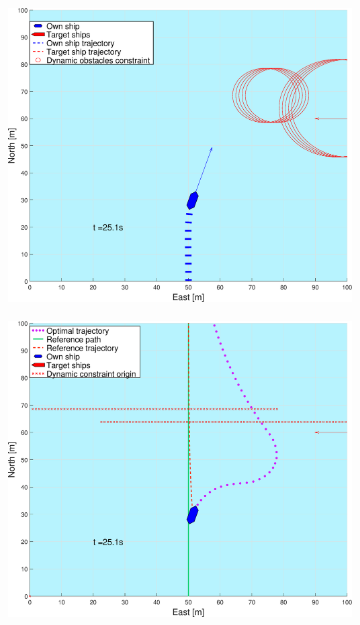 \begin{figure}[ht!]
\begin{subfigure}[b]{0.499\textwidth}
        \subcaption{}
    \end{subfigure}
    \hfill
    \\
    \begin{subfigure}[b]{0.49\textwidth}
        \centering
        \includegraphics[width=\textwidth]{Images/Figures/enkel_GW/_Simple_0fig1_time=25}
        \subcaption{}
    \end{subfigure}
    \hfill
    \begin{subfigure}[b]{0.499\textwidth}
        \centering
        \includegraphics[width=\textwidth]{Images/Figures/enkel_GW/_Simple_0fig999_time=25}

\end{subfigure}
\end{figure}
